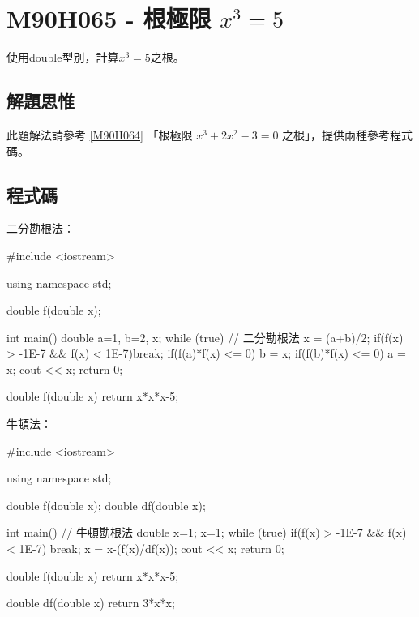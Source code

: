 \section{M90H065 - 根極限 $x^3=5$}

使用double型別，計算$x^3=5$之根。
\subsection{解題思惟}
此題解法請參考
\ref{M90H064}
「根極限 $x^3+2x^2-3=0$ 之根」，提供兩種參考程式碼。

\subsection{程式碼}
二分勘根法：
\begin{cppcode}
	#include <iostream>
	
	using namespace std;
	
	double f(double x);
	
	int main()
	{
		double a=1, b=2, x;
		while (true) {
			// 二分勘根法
			x = (a+b)/2;
			if(f(x) > -1E-7 && f(x) < 1E-7)break;
			if(f(a)*f(x) <= 0) b = x;
			if(f(b)*f(x) <= 0) a = x;
		}
		cout << x;		
		return 0;
	}
	
	double f(double x)
	{
		return x*x*x-5;
	}	
\end{cppcode}

牛頓法：

\begin{cppcode}
	#include <iostream>
	
	using namespace std;
	
	double f(double x);
	double df(double x);
	
	int main()
	{
		// 牛頓勘根法
		double x=1;		
		x=1;
		while (true) {
			if(f(x) > -1E-7 && f(x) < 1E-7) break;
			x = x-(f(x)/df(x));
		}
		cout << x;	
		return 0;
	}
	
	double f(double x)
	{
		return x*x*x-5;
	}
	
	double df(double x)
	{
		return 3*x*x;
	}
\end{cppcode}